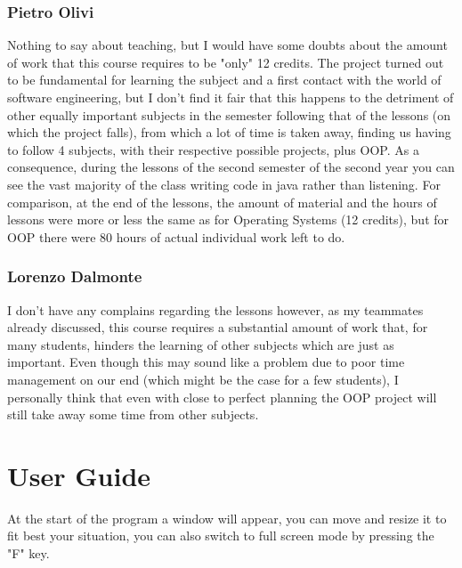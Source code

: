 \documentclass[a4paper,12pt]{report}
\begin{document}
\subsection*{Pietro Olivi}
Nothing to say about teaching, but I would have some doubts about the amount of work that this course requires to be "only" 12 credits. The project turned out to be fundamental for learning the subject and a first 
contact with the world of software engineering, but I don't find it fair that this happens to the detriment of other equally important subjects in the semester following that of the lessons (on which the project falls), 
from which a lot of time is taken away, finding us having to follow 4 subjects, with their respective possible projects, plus OOP. As a consequence, during the lessons of the second semester of the second year you can 
see the vast majority of the class writing code in java rather than listening. For comparison, at the end of the lessons, the amount of material and the hours of lessons were more or less the same as for Operating Systems 
(12 credits), but for OOP there were 80 hours of actual individual work left to do.
\subsection*{Lorenzo Dalmonte}
I don't have any complains regarding the lessons however, as my teammates already discussed, this course requires a substantial amount of work that, for many students,
hinders the learning of other subjects which are just as important. Even though this may sound like a problem due to poor time management on our end (which might be the case for a few students),
I personally think that even with close to perfect planning the OOP project will still take away some time from other subjects.


\appendix
\chapter{User Guide}
At the start of the program a window will appear, you can move and resize it to fit best your situation, you can also {\color{red}switch to full screen mode by pressing the "F" key}.
\end{document}
